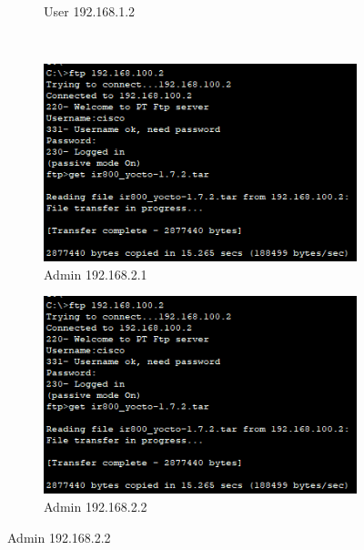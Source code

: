 \begin{figure}[!htb]
\begin{subfigure}{.45\textwidth}
        \caption{User 192.168.1.2}
    \end{subfigure}
    ~
    \begin{subfigure}{.45\textwidth}
        \includegraphics[width=\textwidth,height=\textwidth,keepaspectratio]{./img/tests/Admin1.png}
        \caption{Admin 192.168.2.1}
    \end{subfigure}
    \begin{subfigure}{.45\textwidth}
        \includegraphics[width=\textwidth,height=\textwidth,keepaspectratio]{./img/tests/Admin1.png}
        \caption{Admin 192.168.2.2}
    \end{subfigure}
\end{figure}